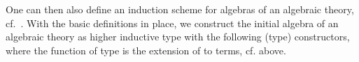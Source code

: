 \documentclass{easychair}
\begin{document}
One can then also define an induction scheme for algebras of an algebraic
theory, cf.~\cite{HermidaJacobs97:IndCoindFib}.
With the basic definitions in place, we construct the initial algebra of
an algebraic theory as higher inductive type with the following
(type) constructors, where the function
 of type
\toA {}
is the extension of  to terms,
cf.  above.
\begin{code}%
\>[6]\AgdaSpace{}%
\>[13]\AgdaSymbol{:}\AgdaSpace{}%
\AgdaSymbol{(}\AgdaSpace{}%
\AgdaSymbol{:}\AgdaSpace{}%
\AgdaSymbol{)}\AgdaSpace{}%
\AgdaSpace{}%
\UZ\AgdaSpace{}%
\<%
\\
%
\>[6]%
\>[13]\AgdaSymbol{:}\AgdaSpace{}%
\AgdaSymbol{(}\AgdaSpace{}%
\AgdaSymbol{:}\AgdaSpace{}%
\AgdaSpace{}%
\sig\AgdaSymbol{)}\AgdaSpace{}%
\AgdaSymbol{(}\AgdaSpace{}%
\AgdaSymbol{:}\AgdaSpace{}%
\AgdaSpace{}%
\sig\AgdaSpace{}%
\AgdaSpace{}%
\AgdaSpace{}%

\end{code}
\end{document}
